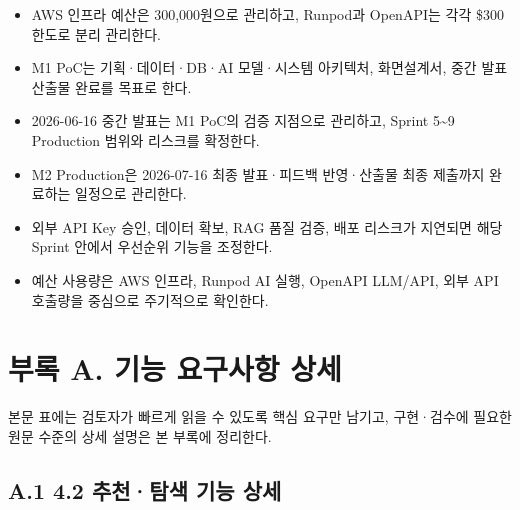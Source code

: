 \documentclass[12pt,a4paper]{article}
\newcommand{\DocNeedspace}[1]{\par\ifdim\dimexpr\pagegoal-\pagetotal\relax<#1\newpage\fi}
\newcommand{\AppendixAnchor}[2]{\hypertarget{app:#1#2}{}}
\begin{document}
\begin{itemize}
\item AWS 인프라 예산은 300,000원으로 관리하고, Runpod과 OpenAPI는 각각 \$300 한도로 분리 관리한다.
\item M1 PoC는 기획·데이터·DB·AI 모델·시스템 아키텍처, 화면설계서, 중간 발표 산출물 완료를 목표로 한다.
\item 2026-06-16 중간 발표는 M1 PoC의 검증 지점으로 관리하고, Sprint 5\textasciitilde{}9 Production 범위와 리스크를 확정한다.
\item M2 Production은 2026-07-16 최종 발표·피드백 반영·산출물 최종 제출까지 완료하는 일정으로 관리한다.
\item 외부 API Key 승인, 데이터 확보, RAG 품질 검증, 배포 리스크가 지연되면 해당 Sprint 안에서 우선순위 기능을 조정한다.
\item 예산 사용량은 AWS 인프라, Runpod AI 실행, OpenAPI LLM/API, 외부 API 호출량을 중심으로 주기적으로 확인한다.
\end{itemize}


\newpage

\DocNeedspace{10\baselineskip}
\section*{부록 A. 기능 요구사항 상세}


\DocNeedspace{5\baselineskip}
본문 표에는 검토자가 빠르게 읽을 수 있도록 핵심 요구만 남기고, 구현·검수에 필요한 원문 수준의 상세 설명은 본 부록에 정리한다.


\DocNeedspace{18\baselineskip}
\AppendixAnchor{A}{1}
\subsection*{A.1 4.2 추천·탐색 기능 상세}
\end{document}
